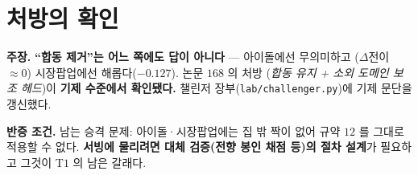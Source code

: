 \documentclass[10pt,a4paper]{article}
\newcommand{\claim}[2]{\begin{claimbox}\textbf{주장.} #1\par\smallskip
  \textcolor{gray!70}{\textbf{반증 조건.} #2}\end{claimbox}}
\begin{document}
\section{처방의 확인}

\claim{\textbf{``합동 제거''는 어느 쪽에도 답이 아니다} --- 아이돌에선 무의미하고
($\Delta$전이 $\approx 0$) 시장팝업에선 해롭다($-0.127$). 논문 $168$ 의 처방
(\emph{합동 유지 + 소외 도메인 보조 헤드})이 \textbf{기제 수준에서 확인됐다.}
챌린저 장부(\texttt{lab/challenger.py})에 기제 문단을 갱신했다.}
{남는 승격 문제: 아이돌·시장팝업에는 집 밖 짝이 없어 규약 $12$ 를 그대로 적용할
수 없다. \textbf{서빙에 물리려면 대체 검증(전향 봉인 채점 등)의 절차 설계}가
필요하고 그것이 T$1$ 의 남은 갈래다.}
\end{document}
